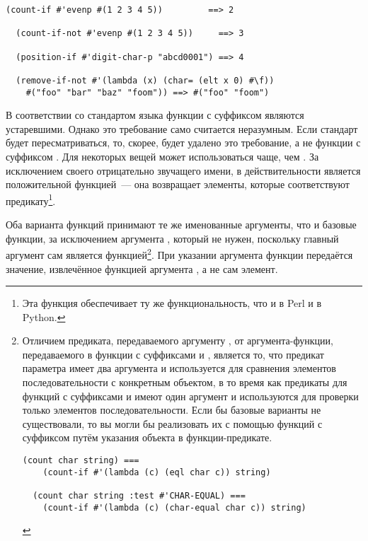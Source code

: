 \begin{lstlisting}[style=lisprepl]
  (count-if #'evenp #(1 2 3 4 5))         ==> 2

  (count-if-not #'evenp #(1 2 3 4 5))     ==> 3

  (position-if #'digit-char-p "abcd0001") ==> 4

  (remove-if-not #'(lambda (x) (char= (elt x 0) #\f))
    #("foo" "bar" "baz" "foom")) ==> #("foo" "foom")
\end{lstlisting}

В соответствии со стандартом языка функции с суффиксом  являются
устаревшими.  Однако это требование само считается неразумным.  Если стандарт будет
пересматриваться, то, скорее, будет удалено это требование, а не функции с суффиксом
.  Для некоторых вещей  может использоваться чаще, чем
.  За исключением своего отрицательно звучащего имени, в действительности
 является положительной функцией~--- она возвращает элементы, которые
соответствуют предикату\footnote{Эта функция обеспечивает ту же функциональность, что и
   в Perl и  в Python.}.

Оба варианта функций принимают те же именованные аргументы, что и базовые функции, за
исключением аргумента , который не нужен, поскольку главный аргумент сам
является функцией\footnote{Отличием предиката, передаваемого аргументу , от
  аргумента-функции, передаваемого в функции с суффиксами  и ,
  является то, что предикат параметра  имеет два аргумента и используется для
  сравнения элементов последовательности с конкретным объектом, в то время как предикаты
  для функций с суффиксами  и  имеют один аргумент и используются
  для проверки только элементов последовательности.  Если бы базовые варианты не
  существовали, то вы могли бы реализовать их с помощью функций с суффиксом 
  путём указания объекта в функции-предикате.

\begin{lstlisting}[style=lisprepl]
  (count char string) ===
    (count-if #'(lambda (c) (eql char c)) string)
  
  (count char string :test #'CHAR-EQUAL) ===
    (count-if #'(lambda (c) (char-equal char c)) string)
\end{lstlisting}

}.  При указании аргумента  функции передаётся значение, извлечённое функцией
аргумента , а не сам элемент.

